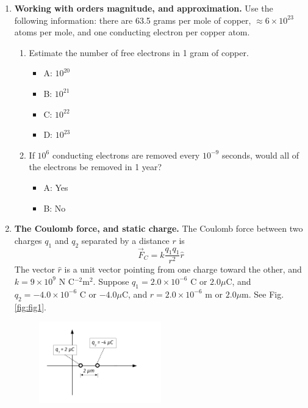 \documentclass[10pt]{article}
\begin{document}
\maketitle

\begin{enumerate}
\item \textbf{Working with orders magnitude, and approximation.} Use the following information: there are 63.5 grams per mole of copper, $\approx 6 \times 10^{23}$ atoms per mole, and one conducting electron per copper atom. 
\begin{enumerate}
\item Estimate the number of free electrons in 1 gram of copper.
\begin{itemize}
\item A: $10^{20}$
\item B: $10^{21}$
\item C: $10^{22}$
\item D: $10^{23}$
\end{itemize}
\item If $10^6$ conducting electrons are removed every $10^{-9}$ seconds, would all of the electrons be removed in 1 year?
\begin{itemize}
\item A: Yes
\item B: No
\end{itemize}
\end{enumerate}
\item \textbf{The Coulomb force, and static charge.} The Coulomb force between two charges $q_1$ and $q_2$ separated by a distance $r$ is 
\begin{equation}
 	\vec{F}_C = k\frac{q_1 q_1}{r^2}\hat{r}
\end{equation}
The vector $\hat{r}$ is a unit vector pointing from one charge toward the other, and $k = 9\times 10^9$ N C$^{-2}$m$^{2}$.  Suppose $q_1 = 2.0\times 10^{-6}$ C or $2.0 \mu$C, and $q_2 = -4.0\times 10^{-6}$ C or $-4.0 \mu$C, and $r=2.0 \times 10^{-6}$ m or $2.0 \mu$m.  See Fig. \ref{fig:fig1}.
\begin{figure}[hb]
\centering
\includegraphics[width=0.5\textwidth]{midtermDiagram1.pdf}

\end{figure}
\end{enumerate}
\end{document}
